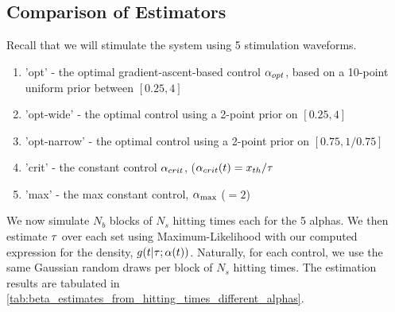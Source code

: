 \documentclass{article}
\begin{document}
% 



\subsection{Comparison of Estimators}

Recall that we will stimulate the system using 5 stimulation
waveforms.  
\begin{enumerate}
  \item 'opt' - the optimal gradient-ascent-based  control ${\alpha}_{opt}$, based on
  a 10-point uniform prior between $[0.25, 4]$
  \item  'opt-wide' - the optimal control using a 2-point prior on  $[0.25, 4]$
  \item 'opt-narrow' - the optimal control using a 2-point prior on $[0.75,
  1/0.75]$
\item   'crit' - the constant control
${\alpha}_{crit}$, (${\alpha}_{crit}(t) =  { x_{th} }/{ \tau }$
\item  'max' - the max constant control, ${ {\alpha}_{\textrm{max}} }$ ($=2$)
\end{enumerate} 

We now simulate $N_b $ blocks of $N_s$ hitting times each for the
5 alphas. We then estimate ${ \tau }$ over each set using Maximum-Likelihood with our
computed expression for the density, $g(t|{ \tau }; {\alpha}(t) )$. 
Naturally, for each control, we use the same Gaussian random draws per block of
$N_s$ hitting times. The estimation results are tabulated in 
\cref{tab:beta_estimates_from_hitting_times_different_alphas}.
\end{document}

